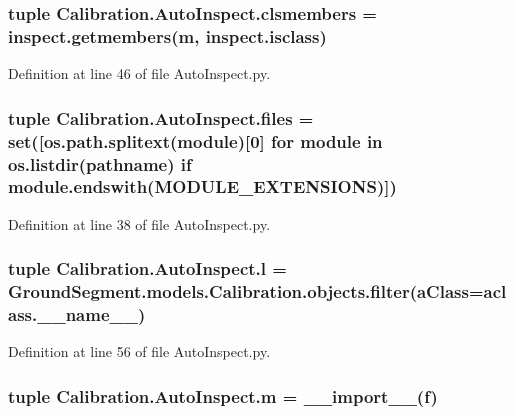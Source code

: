 \subsubsection[{clsmembers}]{\setlength{\rightskip}{0pt plus 5cm}tuple Calibration.\+Auto\+Inspect.\+clsmembers = inspect.\+getmembers({\bf m}, inspect.\+isclass)}\label{namespace_calibration_1_1_auto_inspect_ab0e7aff2928c6e30e46fe2b763c20140}


Definition at line 46 of file Auto\+Inspect.\+py.

\hypertarget{namespace_calibration_1_1_auto_inspect_aa4b6552ca86efb064df344d4f075f68a}{}
\subsubsection[{files}]{\setlength{\rightskip}{0pt plus 5cm}tuple Calibration.\+Auto\+Inspect.\+files = set(\mbox{[}os.\+path.\+splitext(module)\mbox{[}0\mbox{]} for module in os.\+listdir(pathname) {\bf if} module.\+endswith({\bf M\+O\+D\+U\+L\+E\+\_\+\+E\+X\+T\+E\+N\+S\+I\+O\+N\+S})\mbox{]})}\label{namespace_calibration_1_1_auto_inspect_aa4b6552ca86efb064df344d4f075f68a}


Definition at line 38 of file Auto\+Inspect.\+py.

\hypertarget{namespace_calibration_1_1_auto_inspect_ade7796f10954ce2cb1d47e3c4721a4fd}{}
\subsubsection[{l}]{\setlength{\rightskip}{0pt plus 5cm}tuple Calibration.\+Auto\+Inspect.\+l = Ground\+Segment.\+models.\+Calibration.\+objects.\+filter(a\+Class=aclass.\+\_\+\+\_\+name\+\_\+\+\_\+)}\label{namespace_calibration_1_1_auto_inspect_ade7796f10954ce2cb1d47e3c4721a4fd}


Definition at line 56 of file Auto\+Inspect.\+py.

\hypertarget{namespace_calibration_1_1_auto_inspect_a49668bb1b794ae779ef7026664839469}{}
\subsubsection[{m}]{\setlength{\rightskip}{0pt plus 5cm}tuple Calibration.\+Auto\+Inspect.\+m = \+\_\+\+\_\+import\+\_\+\+\_\+(f)}\label{namespace_calibration_1_1_auto_inspect_a49668bb1b794ae779ef7026664839469}


